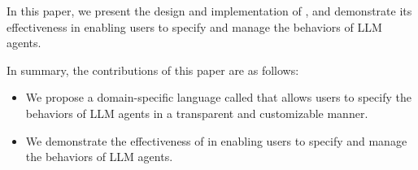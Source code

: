 In this paper, we present the design and implementation of \tool{}, and demonstrate its effectiveness in enabling users to specify and manage the behaviors of LLM agents. 

In summary, the contributions of this paper are as follows:
\begin{itemize}
    \item We propose a domain-specific language called \tool{} that allows users to specify the behaviors of LLM agents in a transparent and customizable manner.
    \item We demonstrate the effectiveness of \tool{} in enabling users to specify and manage the behaviors of LLM agents.
\end{itemize}